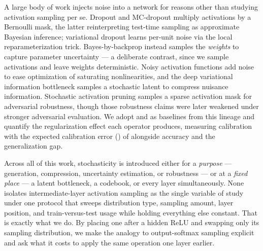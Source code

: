  A large body of work injects noise into a network for reasons other than studying activation sampling per se. Dropout and MC-dropout \citep{srivastava2014dropout,gal2016dropout} multiply activations by a Bernoulli mask, the latter reinterpreting test-time sampling as approximate Bayesian inference; variational dropout \citep{kingma2015variational} learns per-unit noise via the local reparameterization trick. Bayes-by-backprop \citep{blundell2015weight} instead samples the \emph{weights} to capture parameter uncertainty --- a deliberate contrast, since we sample activations and leave weights deterministic. Noisy activation functions \citep{gulcehre2016noisy} add noise to ease optimization of saturating nonlinearities, and the deep variational information bottleneck \citep{alemi2017deepvib,tishby2015deep} samples a stochastic latent to compress nuisance information. Stochastic activation pruning \citep{dhillon2018sap} samples a sparse activation mask for adversarial robustness, though those robustness claims were later weakened under stronger adversarial evaluation. We adopt \dropout{} and \gaussnoise{} as baselines from this lineage and quantify the regularization effect each operator produces, measuring calibration with the expected calibration error (\ece{}) of \citet{guo2017calibration} alongside accuracy and the generalization gap.

 Across all of this work, stochasticity is introduced either for a \emph{purpose} --- generation, compression, uncertainty estimation, or robustness --- or at a \emph{fixed place} --- a latent bottleneck, a codebook, or every layer simultaneously. None isolates intermediate-layer activation sampling as the single variable of study under one protocol that sweeps distribution type, sampling amount, layer position, and train-versus-test usage while holding everything else constant. That is exactly what we do. By placing one \samplinglayer{} after a hidden ReLU and swapping only its sampling distribution, we make the analogy to output-softmax sampling explicit and ask what it costs to apply the same operation one layer earlier.
